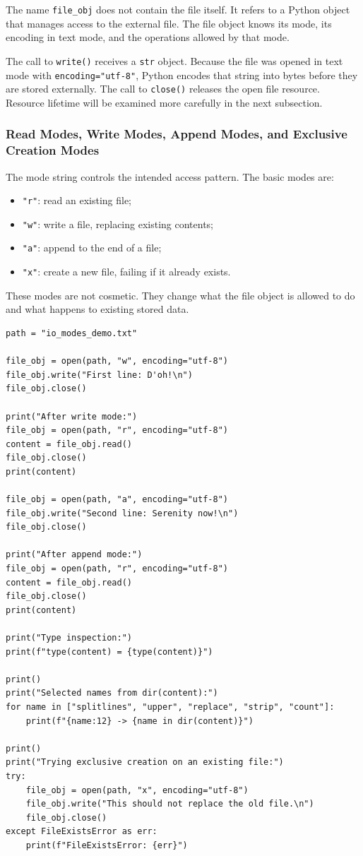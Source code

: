 The name \texttt{file\_obj} does not contain the file itself. It refers to a Python object that manages access to the external file. The file object knows its mode, its encoding in text mode, and the operations allowed by that mode.

The call to \texttt{write()} receives a \texttt{str} object. Because the file was opened in text mode with \texttt{encoding="utf-8"}, Python encodes that string into bytes before they are stored externally. The call to \texttt{close()} releases the open file resource. Resource lifetime will be examined more carefully in the next subsection.

\subsubsection{Read Modes, Write Modes, Append Modes, and Exclusive Creation Modes}

The mode string controls the intended access pattern. The basic modes are:

\begin{itemize}
    \item \texttt{"r"}: read an existing file;
    \item \texttt{"w"}: write a file, replacing existing contents;
    \item \texttt{"a"}: append to the end of a file;
    \item \texttt{"x"}: create a new file, failing if it already exists.
\end{itemize}

These modes are not cosmetic. They change what the file object is allowed to do and what happens to existing stored data.

\begin{verbatim}
path = "io_modes_demo.txt"

file_obj = open(path, "w", encoding="utf-8")
file_obj.write("First line: D'oh!\n")
file_obj.close()

print("After write mode:")
file_obj = open(path, "r", encoding="utf-8")
content = file_obj.read()
file_obj.close()
print(content)

file_obj = open(path, "a", encoding="utf-8")
file_obj.write("Second line: Serenity now!\n")
file_obj.close()

print("After append mode:")
file_obj = open(path, "r", encoding="utf-8")
content = file_obj.read()
file_obj.close()
print(content)

print("Type inspection:")
print(f"type(content) = {type(content)}")

print()
print("Selected names from dir(content):")
for name in ["splitlines", "upper", "replace", "strip", "count"]:
    print(f"{name:12} -> {name in dir(content)}")

print()
print("Trying exclusive creation on an existing file:")
try:
    file_obj = open(path, "x", encoding="utf-8")
    file_obj.write("This should not replace the old file.\n")
    file_obj.close()
except FileExistsError as err:
    print(f"FileExistsError: {err}")
\end{verbatim}

